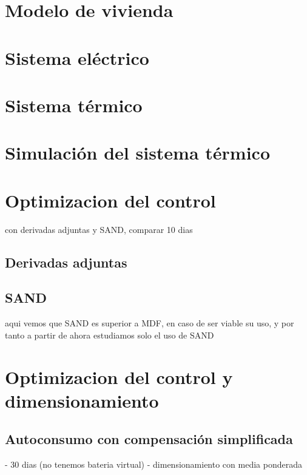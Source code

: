 \section{Modelo de vivienda}

\clearpage

\section{Sistema eléctrico}


\section{Sistema térmico}


\section{Simulación del sistema térmico}


\section{Optimizacion del control}

con derivadas adjuntas y SAND, comparar
10 dias

\subsection{Derivadas adjuntas}
\subsection{SAND}

aqui vemos que SAND es superior a MDF, en caso de ser viable su uso,
y por tanto a partir de ahora estudiamos solo el uso de SAND


\section{Optimizacion del control y dimensionamiento}
\subsection{Autoconsumo con compensación simplificada}
- 30 dias (no tenemos bateria virtual)
- dimensionamiento con media ponderada

